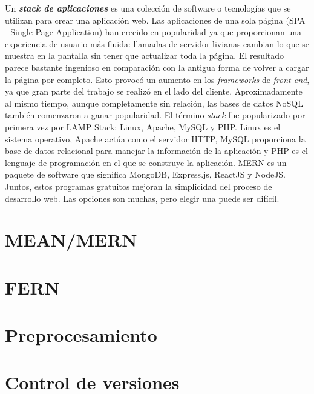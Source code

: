 Un \textbf{\textit{stack de aplicaciones}} es una colección de software o tecnologías que se utilizan para crear una aplicación web. Las aplicaciones de una sola página (SPA - Single Page Application) han crecido en popularidad ya que proporcionan una experiencia de usuario más fluida: llamadas de servidor livianas cambian lo que se muestra en la pantalla sin tener que actualizar toda la página. El resultado parece bastante ingenioso en comparación con la antigua forma de volver a cargar la página por completo. Esto provocó un aumento en los \textit{frameworks} de \textit{front-end}, ya que gran parte del trabajo se realizó en el lado del cliente. Aproximadamente al mismo tiempo, aunque completamente sin relación, las bases de datos NoSQL también comenzaron a ganar popularidad. El término \textit{stack} fue popularizado por primera vez por LAMP Stack: Linux, Apache, MySQL y PHP. Linux es el sistema operativo, Apache actúa como el servidor HTTP, MySQL proporciona la base de datos relacional para manejar la información de la aplicación y PHP es el lenguaje de programación en el que se construye la aplicación. MERN es un paquete de software que significa MongoDB, Express.js, ReactJS y NodeJS. Juntos, estos programas gratuitos mejoran la simplicidad del proceso de desarrollo web. Las opciones son muchas, pero elegir una puede ser difícil.

% 

\section{MEAN/MERN}


\newpage
\section{FERN}


\newpage
\section{Preprocesamiento}


\newpage
\section{Control de versiones}
